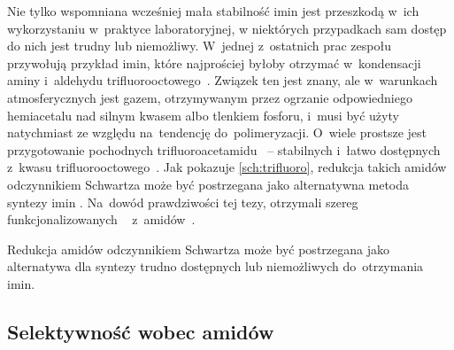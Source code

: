 Nie tylko wspomniana wcześniej mała stabilność imin jest przeszkodą w~ich wykorzystaniu w~praktyce
  laboratoryjnej, w niektórych przypadkach sam dostęp do nich jest trudny lub niemożliwy.
W~jednej z~ostatnich prac zespołu \citeauthor{czerwinski19} przywołują
  przykład imin, które najprościej byłoby otrzymać w~kondensacji aminy i~aldehydu
  trifluorooctowego~.
Związek ten jest znany, ale w~warunkach atmosferycznych jest gazem, otrzymywanym przez ogrzanie
  odpowiedniego hemiacetalu  nad silnym kwasem albo tlenkiem fosforu,
  i~musi być użyty natychmiast ze względu na~tendencję do~polimeryzacji.
O~wiele prostsze jest przygotowanie pochodnych trifluoroacetamidu~ \---
  stabilnych i~łatwo dostępnych z~kwasu trifluorooctowego~.
Jak pokazuje \cref{sch:trifluoro}, redukcja takich amidów odczynnikiem Schwartza może być
  postrzegana jako alternatywna metoda syntezy imin \insitu{}.
Na~dowód prawdziwości tej tezy, \citeauthor{czerwinski19} otrzymali szereg funkcjonalizowanych
  ~ z~amidów~.
\begin{scheme*}
  
  \caption{
    Redukcja amidów odczynnikiem Schwartza może być postrzegana jako alternatywa dla syntezy
      trudno dostępnych lub niemożliwych do~otrzymania imin.
  }
  \label{sch:trifluoro}
\end{scheme*}


\subsection{Selektywność wobec amidów}\label{literature:schwartz:selecivity}
